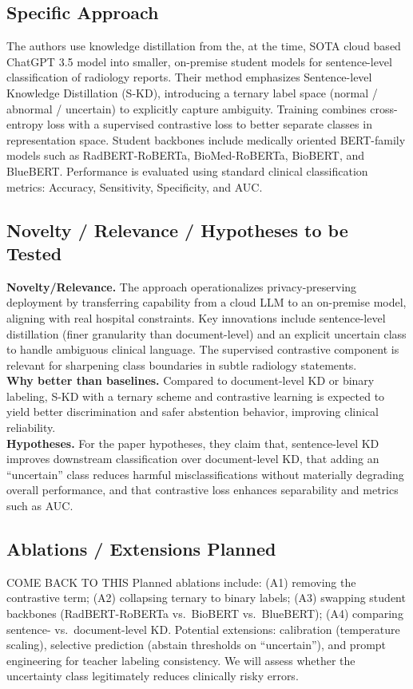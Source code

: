 \documentclass[letterpaper]{article} %
\begin{document}
\subsection{Specific Approach}
The authors use knowledge distillation from the, at the time, SOTA cloud based ChatGPT 3.5 model into smaller, on-premise student models for sentence-level classification of radiology reports. Their method emphasizes Sentence-level Knowledge Distillation (S-KD), introducing a ternary label space (normal / abnormal / uncertain) to explicitly capture ambiguity. Training combines cross-entropy loss with a supervised contrastive loss to better separate classes in representation space. Student backbones include medically oriented BERT-family models such as RadBERT-RoBERTa, BioMed-RoBERTa, BioBERT, and BlueBERT. Performance is evaluated using standard clinical classification metrics: Accuracy, Sensitivity, Specificity, and AUC.

\subsection{Novelty / Relevance / Hypotheses to be Tested}
\textbf{Novelty/Relevance.} The approach operationalizes privacy-preserving deployment by transferring capability from a cloud LLM to an on-premise model, aligning with real hospital constraints. Key innovations include sentence-level distillation (finer granularity than document-level) and an explicit uncertain class to handle ambiguous clinical language. The supervised contrastive component is relevant for sharpening class boundaries in subtle radiology statements. \\
\textbf{Why better than baselines.} Compared to document-level KD or binary labeling, S-KD with a ternary scheme and contrastive learning is expected to yield better discrimination and safer abstention behavior, improving clinical reliability. \\
\textbf{Hypotheses.} For the paper hypotheses, they claim that, sentence-level KD improves downstream classification over document-level KD, that adding an ``uncertain'' class reduces harmful misclassifications without materially degrading overall performance, and that contrastive loss enhances separability and metrics such as AUC.

\subsection{Ablations / Extensions Planned}
COME BACK TO THIS
Planned ablations include: (A1) removing the contrastive term; (A2) collapsing ternary to binary labels; (A3) swapping student backbones (RadBERT-RoBERTa vs.\ BioBERT vs.\ BlueBERT); (A4) comparing sentence- vs.\ document-level KD. Potential extensions: calibration (temperature scaling), selective prediction (abstain thresholds on ``uncertain''), and prompt engineering for teacher labeling consistency. We will assess whether the uncertainty class legitimately reduces clinically risky errors.
\end{document}
